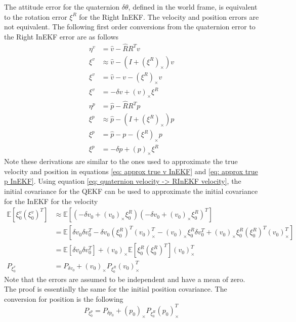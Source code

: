 The attitude error for the quaternion $\delta \theta$, defined in the world frame, is equivalent to the rotation error $\xi^R$ for the Right InEKF. The velocity and position errors are not equivalent. The following first order conversions from the quaternion error to the Right InEKF error are as follows \cite{Contact-Aided_Invarant_EKF}
\begin{equation}
    \begin{split}
        \eta^v &= \hat{v} - \hat{R} R^T v \\
        \xi^v &\approx \hat{v} - (I + (\xi^R)_{\times}) v \\
        \xi^v &= \hat{v} - v - (\xi^R)_{\times} v \\
        \xi^v &= -\delta v + (v)_{\times} \xi^R
    \end{split}
    \label{eq: quaternion velocity -> RInEKF velocity}
\end{equation}
\begin{equation}
    \begin{split}
        \eta^p &= \hat{p} - \hat{R} R^T p \\
        \xi^p &\approx \hat{p} - (I + (\xi^R)_{\times}) p \\
        \xi^p &= \hat{p} - p - (\xi^R)_{\times} p \\
        \xi^p &= -\delta p + (p)_{\times} \xi^R
    \end{split}
    \label{eq: quaternion position -> RInEKF position}
\end{equation}
Note these derivations are similar to the ones used to approximate the true velocity and position in equations \eqref{eq: approx true v InEKF} and \eqref{eq: approx true p InEKF}. Using equation \eqref{eq: quaternion velocity -> RInEKF velocity}, the initial covariance for the QEKF can be used to approximate the initial covariance for the InEKF for the velocity
\begin{equation}
    \begin{split}
        \mathbb{E}[\xi_0^v (\xi_0^v)^T] &\approx \mathbb{E}[( -\delta v_0 + (v_0)_{\times} \xi_0^R) ( -\delta v_0 + (v_0)_{\times} \xi_0^R)^T]\\ 
        &= \mathbb{E}[\delta v_0 \delta v_0^T - 
            \delta v_0 (\xi_0^R)^T (v_0)_{\times}^T  -
            (v_0)_{\times} \xi_0^R \delta v_0^T +
            (v_0)_{\times} \xi_0^R (\xi_0^R)^T (v_0)_{\times}^T
            ]\\
        &= \mathbb{E}[\delta v_0 \delta v_0^T] 
            + (v_0)_{\times} \mathbb{E}[\xi_0^R (\xi_0^R)^T] (v_0)_{\times}^T \\
        P_{\xi^v_0} &= P_{\delta v_0} + (v_0)_{\times} P_{\xi^R_0} (v_0)_{\times}^T
        \label{eq: v initial covariance InEKF}
    \end{split}
\end{equation}
Note that the errors are assumed to be independent and have a mean of zero. The proof is essentially the same for the initial position covariance. The conversion for position is the following
\begin{equation}
    P_{\xi^p_0} = P_{\delta p_0} + (p_0)_{\times} P_{\xi^R_0} (p_0)_{\times}^T
    \label{eq: p initial covariance InEKF}
\end{equation}


